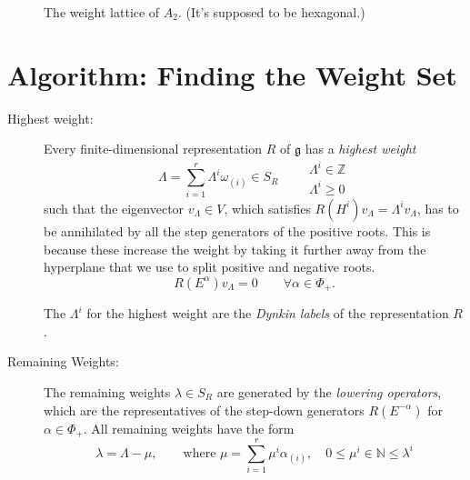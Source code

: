 \begin{figure}[tbhp]
  \centering
  \def\svgwidth{0.4\columnwidth}
  
  \caption{The weight lattice of $A_2$. (It's supposed to be hexagonal.)}
  \label{fig:l22f1}
\end{figure}

\section{Algorithm: Finding the Weight Set}%
\label{sec:highest_weight_representations}

\begin{description}
  \item[Highest weight:] Every finite-dimensional representation $R$  of $\mathfrak{g}$  has a \emph{highest weight} 
  \begin{equation}
    \Lambda = \sum_{i=1}^{r} \Lambda^{i} \omega_{(i)} \in S_R \qquad 
    \begin{gathered}
      \Lambda^{i} \in \mathbb{Z} \\
      \Lambda^{i} \geq 0
    \end{gathered}
  \end{equation}
  such that the eigenvector $v_{\Lambda} \in V$, which satisfies $R(H^{i}) v_{\Lambda} = \Lambda^{i} v_{\Lambda}$, has to be annihilated by all the step generators of the positive roots. This is because these increase the weight by taking it further away from the hyperplane that we use to split positive and negative roots.
  \begin{equation}
    R(E^{\alpha}) v_{\Lambda} = 0 \qquad \forall\alpha \in \Phi_{+}.
  \end{equation}

  \begin{definition}[]
    The $\Lambda^{i}$ for the highest weight are the \emph{Dynkin labels} of the representation $R$.
  \end{definition}

\item[Remaining Weights:]
  The remaining weights $\lambda \in S_R$ are generated by the \emph{lowering operators}, which are the representatives of the step-down generators $R(E^{-\alpha})$ for $\alpha \in \Phi_{+}$.
  All remaining weights have the form
  \begin{equation}
    \lambda = \Lambda - \mu, \qquad \text{where } \mu = \sum_{i=1}^{r}\mu^{i} \alpha_{(i)}, \quad 0 \leq \mu^{i} \in \mathbb{N} \leq \lambda^{i}
  \end{equation}


\end{description}
